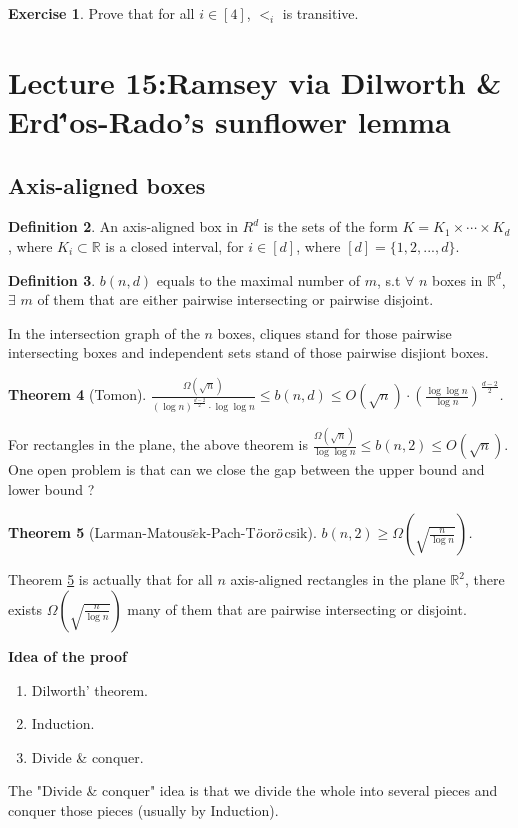 \documentclass{article}
\newtheorem{theorem}{Theorem}[section]
\theoremstyle{definition}
\newtheorem{definition}[theorem]{Definition}
\newtheorem{exercise}[theorem]{Exercise}
\begin{document}
\begin{exercise}
    Prove that for all $i\in [4]$, $<_i$ is transitive.
\end{exercise}

\newpage

\section{Lecture 15:Ramsey via Dilworth \&  Erd\''os-Rado's sunflower lemma}
\subsection{Axis-aligned boxes}
\begin{definition}
   An axis-aligned box in $R^d$ is the sets  of the form $K=K_1\times\cdots\times K_d$, where $K_i\subset\mathbb{R} $ is a closed interval, for $i\in [d]$, where $[d]=\{1,2,...,d\}$.
\end{definition}
\begin{definition}
    $b(n,d)$ equals to the maximal number of $m$, s.t  $\forall$ $n$ boxes in $\mathbb{R}^d$, $\exists$ $m$ of them that are either pairwise intersecting or pairwise disjoint.
\end{definition}
In the intersection graph of the $n$ boxes, cliques stand for those pairwise intersecting boxes and independent sets stand of those pairwise disjiont boxes.

\begin{theorem}[Tomon\cite{tomon2022lower}]
    $\frac{\Omega(\sqrt{n})}{(\log n)^{\frac{d-2}{2}} 
\cdot  \log\log n}   \leq b(n,d)\leq O(\sqrt{n})\cdot (\frac{\log\log n}{\log n})^{\frac{d-2}{2}}$.
\end{theorem}

 For rectangles in the plane, the above theorem is $\frac{\Omega(\sqrt{n})}{\log\log n}  \leq b(n,2)\leq O(\sqrt{n})$. One open problem is that can 
 we close the gap between the upper bound and lower bound ?
\begin{theorem}[Larman-Matous$\breve{e}$k-Pach-T$\Ddot{o}$or$\Ddot{o}$csik]\label{thm15.4}
    $b(n,2)\geq \Omega(\sqrt{\frac{n}{\log n}})$.
\end{theorem}
Theorem \ref{thm15.4} is actually that for all $n$ axis-aligned rectangles in the plane $\mathbb{R}^2$, there exists $\Omega(\sqrt{\frac{n}{\log n}})$ many of them that are pairwise intersecting or disjoint.


\textbf{Idea of the proof }
  \begin{enumerate}
        \item Dilworth' theorem.

        \item Induction.

        \item Divide \& conquer.
    \end{enumerate}
 The "Divide \& conquer" idea is that we divide the whole into several pieces and conquer those pieces (usually by Induction).
\end{document}
